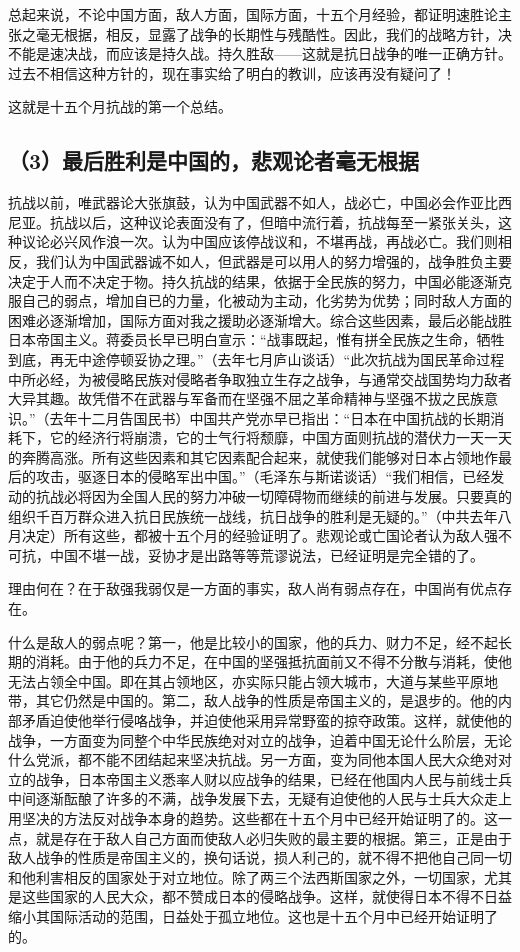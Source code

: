 总起来说，不论中国方面，敌人方面，国际方面，十五个月经验，都证明速胜论主张之毫无根据，相反，显露了战争的长期性与残酷性。因此，我们的战略方针，决不能是速决战，而应该是持久战。持久胜敌——这就是抗日战争的唯一正确方针。过去不相信这种方针的，现在事实给了明白的教训，应该再没有疑问了！

这就是十五个月抗战的第一个总结。

\subsection{（3）最后胜利是中国的，悲观论者毫无根据}

抗战以前，唯武器论大张旗鼓，认为中国武器不如人，战必亡，中国必会作亚比西尼亚。抗战以后，这种议论表面没有了，但暗中流行着，抗战每至一紧张关头，这种议论必兴风作浪一次。认为中国应该停战议和，不堪再战，再战必亡。我们则相反，我们认为中国武器诚不如人，但武器是可以用人的努力增强的，战争胜负主要决定于人而不决定于物。持久抗战的结果，依据于全民族的努力，中国必能逐渐克服自己的弱点，增加自已的力量，化被动为主动，化劣势为优势；同时敌人方面的困难必逐渐增加，国际方面对我之援助必逐渐增大。综合这些因素，最后必能战胜日本帝国主义。蒋委员长早已明白宣示：“战事既起，惟有拼全民族之生命，牺牲到底，再无中途停顿妥协之理。”（去年七月庐山谈话）“此次抗战为国民革命过程中所必经，为被侵略民族对侵略者争取独立生存之战争，与通常交战国势均力敌者大异其趣。故凭借不在武器与军备而在坚强不屈之革命精神与坚强不拔之民族意识。”（去年十二月告国民书）中国共产党亦早已指出：“日本在中国抗战的长期消耗下，它的经济行将崩溃，它的士气行将颓靡，中国方面则抗战的潜伏力一天一天的奔腾高涨。所有这些因素和其它因素配合起来，就使我们能够对日本占领地作最后的攻击，驱逐日本的侵略军出中国。”（毛泽东与斯诺谈话）“我们相信，已经发动的抗战必将因为全国人民的努力冲破一切障碍物而继续的前进与发展。只要真的组织千百万群众进入抗日民族统一战线，抗日战争的胜利是无疑的。”（中共去年八月决定）所有这些，都被十五个月的经验证明了。悲观论或亡国论者认为敌人强不可抗，中国不堪一战，妥协才是出路等等荒谬说法，已经证明是完全错的了。

理由何在？在于敌强我弱仅是一方面的事实，敌人尚有弱点存在，中国尚有优点存在。

什么是敌人的弱点呢？第一，他是比较小的国家，他的兵力、财力不足，经不起长期的消耗。由于他的兵力不足，在中国的坚强抵抗面前又不得不分散与消耗，使他无法占领全中国。即在其占领地区，亦实际只能占领大城市，大道与某些平原地带，其它仍然是中国的。第二，敌人战争的性质是帝国主义的，是退步的。他的内部矛盾迫使他举行侵咯战争，并迫使他采用异常野蛮的掠夺政策。这样，就使他的战争，一方面变为同整个中华民族绝对对立的战争，迫着中国无论什么阶层，无论什么党派，都不能不团结起来坚决抗战。另一方面，变为同他本国人民大众绝对对立的战争，日本帝国主义悉率人财以应战争的结果，已经在他国内人民与前线士兵中间逐渐酝酿了许多的不满，战争发展下去，无疑有迫使他的人民与士兵大众走上用坚决的方法反对战争本身的趋势。这些都在十五个月中已经开始证明了的。这一点，就是存在于敌人自己方面而使敌人必归失败的最主要的根据。第三，正是由于敌人战争的性质是帝国主义的，换句话说，损人利己的，就不得不把他自己同一切和他利害相反的国家处于对立地位。除了两三个法西斯国家之外，一切国家，尤其是这些国家的人民大众，都不赞成日本的侵略战争。这样，就使得日本不得不日益缩小其国际活动的范围，日益处于孤立地位。这也是十五个月中已经开始证明了的。

